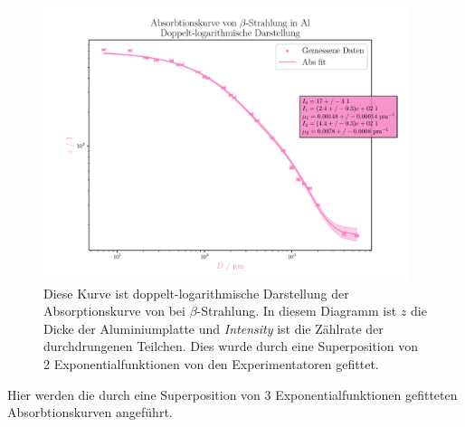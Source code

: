 \documentclass[12pt,english,ngerman]{scrartcl}
\begin{document}
\begin{figure}[H]
	\begin{center}
		\includegraphics[width=0.95\textwidth]{figures/absorption2log2er.pdf}
	\end{center}
	\caption[Doppelt-logarithmische Darstellung der Absorptionskurve von  bei
		$\beta$-Strahlung (2er Superposition Experimentatoren)]{
		Diese Kurve ist
		doppelt-logarithmische Darstellung der Absorptionskurve von  bei
		$\beta$-Strahlung. In diesem Diagramm ist $z$ die Dicke der Aluminiumplatte und
		\emph{Intensity} ist die Zählrate der durchdrungenen Teilchen. Dies wurde durch
		eine Superposition von 2 Exponentialfunktionen von den Experimentatoren
		gefittet.
	}\label{fig:2er_alu_abs_doppel}
\end{figure}

Hier werden die durch eine Superposition von 3 Exponentialfunktionen gefitteten
Absorbtionskurven angeführt.
\end{document}
